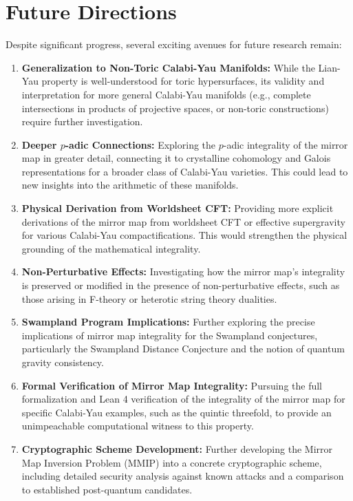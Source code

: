 \documentclass{book}
\theoremstyle{definition}
\begin{document}
\section{Future Directions}
Despite significant progress, several exciting avenues for future research remain:
\begin{enumerate}
    \item \textbf{Generalization to Non-Toric Calabi-Yau Manifolds:} While the Lian-Yau property is well-understood for toric hypersurfaces, its validity and interpretation for more general Calabi-Yau manifolds (e.g., complete intersections in products of projective spaces, or non-toric constructions) require further investigation.
    \item \textbf{Deeper $p$-adic Connections:} Exploring the $p$-adic integrality of the mirror map in greater detail, connecting it to crystalline cohomology and Galois representations for a broader class of Calabi-Yau varieties. This could lead to new insights into the arithmetic of these manifolds.
    \item \textbf{Physical Derivation from Worldsheet CFT:} Providing more explicit derivations of the mirror map from worldsheet CFT or effective supergravity for various Calabi-Yau compactifications. This would strengthen the physical grounding of the mathematical integrality.
    \item \textbf{Non-Perturbative Effects:} Investigating how the mirror map's integrality is preserved or modified in the presence of non-perturbative effects, such as those arising in F-theory or heterotic string theory dualities.
    \item \textbf{Swampland Program Implications:} Further exploring the precise implications of mirror map integrality for the Swampland conjectures, particularly the Swampland Distance Conjecture and the notion of quantum gravity consistency.
    \item \textbf{Formal Verification of Mirror Map Integrality:} Pursuing the full formalization and Lean 4 verification of the integrality of the mirror map for specific Calabi-Yau examples, such as the quintic threefold, to provide an unimpeachable computational witness to this property.
    \item \textbf{Cryptographic Scheme Development:} Further developing the Mirror Map Inversion Problem (MMIP) into a concrete cryptographic scheme, including detailed security analysis against known attacks and a comparison to established post-quantum candidates.
\end{enumerate}
\end{document}
